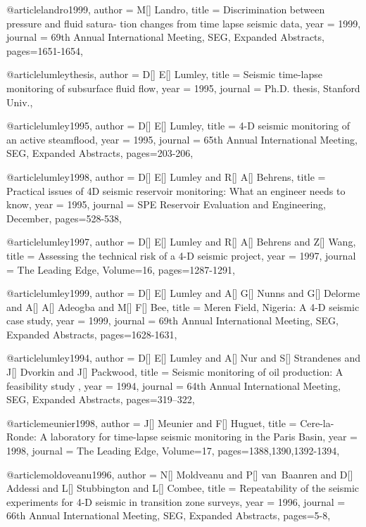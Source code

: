 @article{landro1999,
  author =	 {M[] Landro},
  title =	 {Discrimination between pressure and fluid satura-
tion changes from time lapse seismic data},
  year =	 1999,
  journal =	 {69th Annual International Meeting, SEG, Expanded Abstracts},
 pages=1651-1654,
}

@article{lumleythesis,
  author =	 {D[] E[] Lumley},
  title =	 {Seismic time-lapse monitoring of subsurface fluid
flow},
  year =	 1995,
  journal =	 {Ph.D. thesis, Stanford Univ.},
}

@article{lumley1995,
  author =	 {D[] E[] Lumley},
  title =	 { 4-D seismic monitoring of an active steamflood},
  year =	 1995,
  journal =	 {65th Annual International Meeting, SEG, Expanded Abstracts},
 pages=203-206,
}

@article{lumley1998,
  author =	 {D[] E[] Lumley and R[] A[] Behrens},
  title =	 { Practical issues of 4D seismic reservoir monitoring: What an engineer needs to know},
  year =	 1995,
  journal =	 {SPE Reservoir Evaluation and Engineering, December},
 pages=528-538,
}

@article{lumley1997,
  author =	 {D[] E[] Lumley and R[] A[] Behrens and Z[] Wang},
  title =	 {Assessing the technical risk of a 4-D seismic project},
  year =	 1997,
  journal =	 {The Leading Edge},
    Volume=16,
 pages=1287-1291,
}

@article{lumley1999,
  author =	 {D[] E[] Lumley and A[] G[] Nunns and G[] Delorme and A[] A[] Adeogba and M[] F[] Bee},
  title =	 {Meren Field, Nigeria: A 4-D seismic case study},
  year =	 1999,
  journal =	 {69th Annual International Meeting, SEG, Expanded Abstracts},
 pages=1628-1631,
}


@article{lumley1994,
  author =	 {D[] E[] Lumley and A[] Nur and S[] Strandenes and J[] Dvorkin and J[] Packwood},
  title =	 {Seismic monitoring of oil production: A feasibility study
},
  year =	 1994,
  journal =	 {64th Annual International Meeting, SEG, Expanded Abstracts},
 pages=319–322,
}

@article{meunier1998,
  author =	 {J[] Meunier and F[] Huguet},
  title =	 {Cere-la-Ronde: A laboratory for time-lapse seismic monitoring in the Paris Basin},
  year =	 1998,
  journal =	 {The Leading Edge},
    Volume=17,
 pages=1388,1390,1392-1394,
}

@article{moldoveanu1996,
  author =	 {N[] Moldveanu and P[] van~Baanren and D[] Addessi and L[] Stubbington and L[] Combee},
  title =	 {Repeatability of the seismic experiments for 4-D
seismic in transition zone surveys},
  year =	 1996,
  journal =	 {66th Annual International Meeting, SEG, Expanded Abstracts},
 pages=5-8,
}


